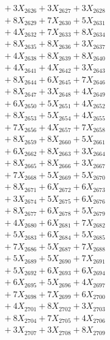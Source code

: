 \documentclass[a4paper,10pt]{article}
\begin{document}
{\begin{align}
&\;  + 3 X_{2626} + 3 X_{2627} + 3 X_{2628} \\[0.3ex]
&\;  + 8 X_{2629} + 7 X_{2630} + 5 X_{2631} \\[0.3ex]
&\;  + 4 X_{2632} + 7 X_{2633} + 8 X_{2634} \\[0.3ex]
&\;  + 8 X_{2635} + 8 X_{2636} + 3 X_{2637} \\[0.3ex]
&\;  + 4 X_{2638} + 8 X_{2639} + 8 X_{2640} \\[0.3ex]
&\;  + 4 X_{2641} + 4 X_{2642} + 3 X_{2643} \\[0.3ex]
&\;  + 8 X_{2644} + 6 X_{2645} + 7 X_{2646} \\[0.3ex]
&\;  + 8 X_{2647} + 3 X_{2648} + 4 X_{2649} \\[0.5ex]\allowbreak
&\;  + 6 X_{2650} + 5 X_{2651} + 4 X_{2652} \\[0.3ex]
&\;  + 8 X_{2653} + 5 X_{2654} + 4 X_{2655} \\[0.3ex]
&\;  + 7 X_{2656} + 4 X_{2657} + 7 X_{2658} \\[0.3ex]
&\;  + 8 X_{2659} + 8 X_{2660} + 5 X_{2661} \\[0.3ex]
&\;  + 6 X_{2662} + 8 X_{2663} + 3 X_{2664} \\[0.3ex]
&\;  + 8 X_{2665} + 8 X_{2666} + 3 X_{2667} \\[0.3ex]
&\;  + 7 X_{2668} + 5 X_{2669} + 5 X_{2670} \\[0.3ex]
&\;  + 8 X_{2671} + 6 X_{2672} + 6 X_{2673} \\[0.3ex]
&\;  + 3 X_{2674} + 5 X_{2675} + 6 X_{2676} \\[0.3ex]
&\;  + 8 X_{2677} + 6 X_{2678} + 5 X_{2679} \\[0.5ex]\allowbreak
&\;  + 4 X_{2680} + 6 X_{2681} + 7 X_{2682} \\[0.3ex]
&\;  + 5 X_{2683} + 6 X_{2684} + 5 X_{2685} \\[0.3ex]
&\;  + 7 X_{2686} + 5 X_{2687} + 7 X_{2688} \\[0.3ex]
&\;  + 5 X_{2689} + 5 X_{2690} + 7 X_{2691} \\[0.3ex]
&\;  + 5 X_{2692} + 6 X_{2693} + 6 X_{2694} \\[0.3ex]
&\;  + 6 X_{2695} + 5 X_{2696} + 4 X_{2697} \\[0.3ex]
&\;  + 7 X_{2698} + 7 X_{2699} + 6 X_{2700} \\[0.3ex]
&\;  + 4 X_{2701} + 8 X_{2702} + 3 X_{2703} \\[0.3ex]
&\;  + 8 X_{2704} + 7 X_{2705} + 4 X_{2706} \\[0.3ex]
&\;  + 3 X_{2707} + 3 X_{2708} + 8 X_{2709} \\[0.5ex]\allowbreak

\end{align}}
\end{document}
